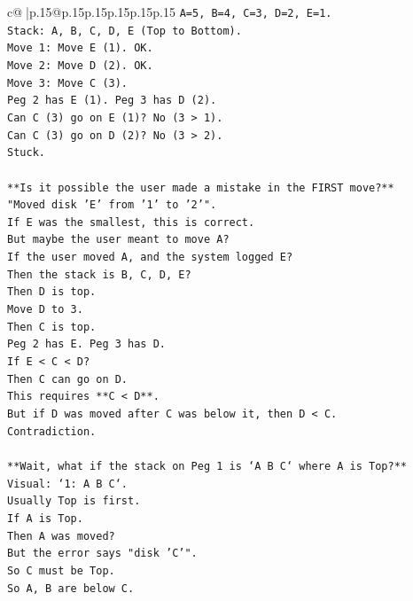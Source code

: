 \documentclass{article}
\begin{document}
{\begin{supertabular}{c@{$\;$}|p{.15\linewidth}@{}p{.15\linewidth}p{.15\linewidth}p{.15\linewidth}p{.15\linewidth}p{.15\linewidth}}
{{{\texttt{A=5, B=4, C=3, D=2, E=1.} \\
\texttt{Stack: A, B, C, D, E (Top to Bottom).} \\
\texttt{Move 1: Move E (1). OK.} \\
\texttt{Move 2: Move D (2). OK.} \\
\texttt{Move 3: Move C (3).} \\
\texttt{Peg 2 has E (1). Peg 3 has D (2).} \\
\texttt{Can C (3) go on E (1)? No (3 > 1).} \\
\texttt{Can C (3) go on D (2)? No (3 > 2).} \\
\texttt{Stuck.} \\
\\ 
\texttt{**Is it possible the user made a mistake in the FIRST move?**} \\
\texttt{"Moved disk 'E' from '1' to '2'".} \\
\texttt{If E was the smallest, this is correct.} \\
\texttt{But maybe the user meant to move A?} \\
\texttt{If the user moved A, and the system logged E?} \\
\texttt{Then the stack is B, C, D, E?} \\
\texttt{Then D is top.} \\
\texttt{Move D to 3.} \\
\texttt{Then C is top.} \\
\texttt{Peg 2 has E. Peg 3 has D.} \\
\texttt{If E < C < D?} \\
\texttt{Then C can go on D.} \\
\texttt{This requires **C < D**.} \\
\texttt{But if D was moved after C was below it, then D < C.} \\
\texttt{Contradiction.} \\
\\ 
\texttt{**Wait, what if the stack on Peg 1 is `A B C` where A is Top?**} \\
\texttt{Visual: `1: A B C`.} \\
\texttt{Usually Top is first.} \\
\texttt{If A is Top.} \\
\texttt{Then A was moved?} \\
\texttt{But the error says "disk 'C'".} \\
\texttt{So C must be Top.} \\
\texttt{So A, B are below C.} \\
}}}
\end{supertabular}}
\end{document}
